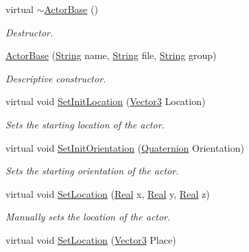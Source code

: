 \begin{DoxyCompactItemize}
\item 
virtual \hyperlink{classphys_1_1ActorBase_a5e5d4b50c83c6851e554b5e7ad65403f}{$\sim$ActorBase} ()
\begin{DoxyCompactList}\small\item\em Destructor. \item\end{DoxyCompactList}\item 
\hyperlink{classphys_1_1ActorBase_ae807b3c297a038572bdbfe975754c2e5}{ActorBase} (\hyperlink{namespacephys_aa03900411993de7fbfec4789bc1d392e}{String} name, \hyperlink{namespacephys_aa03900411993de7fbfec4789bc1d392e}{String} file, \hyperlink{namespacephys_aa03900411993de7fbfec4789bc1d392e}{String} group)
\begin{DoxyCompactList}\small\item\em Descriptive constructor. \item\end{DoxyCompactList}\item 
virtual void \hyperlink{classphys_1_1ActorBase_a0ff0980bcf33a8205eb058b8caa1f36b}{SetInitLocation} (\hyperlink{classphys_1_1Vector3}{Vector3} Location)
\begin{DoxyCompactList}\small\item\em Sets the starting location of the actor. \item\end{DoxyCompactList}\item 
virtual void \hyperlink{classphys_1_1ActorBase_a681186465db767954ca3f9530a1d7c36}{SetInitOrientation} (\hyperlink{classphys_1_1Quaternion}{Quaternion} Orientation)
\begin{DoxyCompactList}\small\item\em Sets the starting orientation of the actor. \item\end{DoxyCompactList}\item 
virtual void \hyperlink{classphys_1_1ActorBase_a0b0db2ec0f4926326635b86f1ead2276}{SetLocation} (\hyperlink{namespacephys_af7eb897198d265b8e868f45240230d5f}{Real} x, \hyperlink{namespacephys_af7eb897198d265b8e868f45240230d5f}{Real} y, \hyperlink{namespacephys_af7eb897198d265b8e868f45240230d5f}{Real} z)
\begin{DoxyCompactList}\small\item\em Manually sets the location of the actor. \item\end{DoxyCompactList}\item 
virtual void \hyperlink{classphys_1_1ActorBase_a3212be459859a67bf7ae64919d58d5a5}{SetLocation} (\hyperlink{classphys_1_1Vector3}{Vector3} Place)

\end{DoxyCompactItemize}
